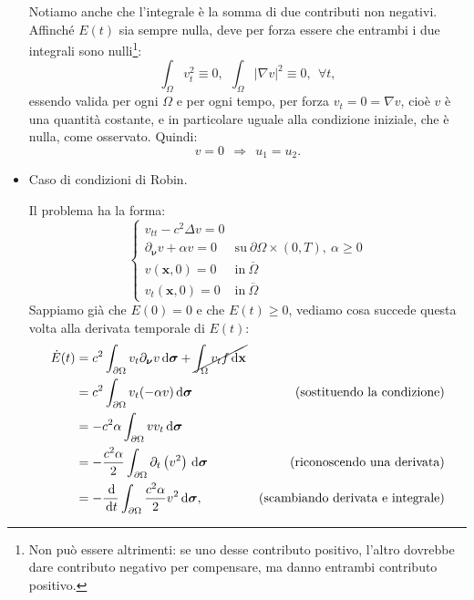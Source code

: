 \documentclass[10pt,a4paper,twoside,openright]{book}
\newcommand{\x}{\mathbf{x}}
\newcommand{\sigg}{\bm{\sigma}}
\newcommand{\de}{\,\mathrm d}
\newcommand{\dt}{\de t}
\newcommand{\dxx}{\de \x}
\newcommand{\dsig}{\de \sigg}
\begin{document}
\begin{dimostrazione}
\begin{itemize}
		Notiamo anche che l'integrale è la somma di due contributi non negativi. Affinché $E(t)$ sia sempre nulla, deve per forza essere che entrambi i due integrali sono nulli\footnote{Non può essere altrimenti: se uno desse contributo positivo, l'altro dovrebbe dare contributo negativo per compensare, ma danno entrambi contributo positivo.}:
		\begin{equation*}
			\int _{\Omega } v_{t}^{2} \equiv 0,\ \ \int _{\Omega }| \nabla v| ^{2} \equiv 0,\ \ \forall t,
		\end{equation*}essendo valida per ogni $\Omega $ e per ogni tempo, per forza $v_{t} =0=\nabla v$, cioè $v$ è una quantità costante, e in particolare uguale alla condizione iniziale, che è nulla, come osservato. Quindi:
		\begin{equation*}
			v=0\ \ \Rightarrow \ \ u_{1} =u_{2} .
		\end{equation*}
		\item Caso di condizioni di Robin.
		      
		      Il problema ha la forma:
		      \begin{equation*}
		      	\begin{cases}
		      		v_{tt} -c^{2} \Delta v=0           &                                                                 \\
		      		\partial _{\bm{\nu }} v+\alpha v=0 & \text{su} \ \partial \Omega \times (0,T) ,\ \alpha \geqslant 0 \\
		      		v(\x ,0) =0                & \text{in} \ \overline{\Omega }                                  \\
		      		v_{t}(\x ,0) =0            & \text{in} \ \overline{\Omega }                                  
		      	\end{cases}
		      \end{equation*}Sappiamo già che $E(0) =0$ e che $E(t) \geqslant 0$, vediamo cosa succede questa volta alla derivata temporale di $E(t)$:
		      \begin{align*}
		      	\dot{E}(t) & =c^{2}\int _{\partial \Omega } v_{t} \partial _{\bm{\nu }} v\dsig +\cancel{\int _{\Omega } v_{t} f\dxx} &                                          \\
		      	            & =c^{2}\int _{\partial \Omega } v_{t}(-\alpha v) \dsig                                                           & \text{(sostituendo la condizione)}       \\
		      	            & =-c^{2} \alpha \int _{\partial \Omega } vv_{t} \dsig                                                             &                                          \\
		      	            & =-\frac{c^{2} \alpha }{2}\int _{\partial \Omega } \partial _{t}\left(v^{2}\right) \dsig                         & \text{(riconoscendo una derivata)}       \\
		      	            & =-\frac{\de}{\dt}\int _{\partial \Omega }\frac{c^{2} \alpha }{2} v^{2} \dsig ,                                      & \text{(scambiando derivata e integrale)} 
		      \end{align*}
		      

\end{itemize}
\end{dimostrazione}
\end{document}

